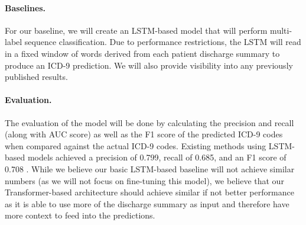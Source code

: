 \documentclass{article}
\begin{document}
\paragraph{Baselines.}
For our baseline, we will create an LSTM-based model that will perform multi-label sequence classification. Due to performance restrictions, the LSTM will read in a fixed window of words derived from each patient discharge summary to produce an ICD-9 prediction. We will also provide visibility into any previously published results.

\paragraph{Evaluation.}
The evaluation of the model will be done by calculating the precision and recall (along with AUC score) as well as the F1 score of the predicted ICD-9 codes when compared against the actual ICD-9 codes. Existing methods using LSTM-based models achieved a precision of 0.799, recall of 0.685, and an F1 score of 0.708 \cite{ayyar2016tagging}. While we believe our basic LSTM-based baseline will not achieve similar numbers (as we will not focus on fine-tuning this model), we believe that our Transformer-based architecture should achieve similar if not better performance as it is able to use more of the discharge summary as input and therefore have more context to feed into the predictions. 



\end{document}
